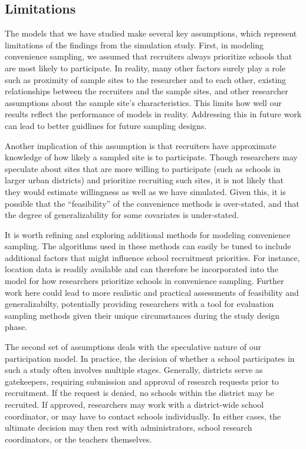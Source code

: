 \documentclass[man,floatsintext]{apa6}
\begin{document}
\hypertarget{limitations}{%
\subsection{Limitations}\label{limitations}}

The models that we have studied make several key assumptions, which represent limitations of the findings from the simulation study. First, in modeling convenience sampling, we assumed that recruiters always prioritize schools that are most likely to participate. In reality, many other factors surely play a role such as proximity of sample sites to the researcher and to each other, existing relationships between the recruiters and the sample sites, and other researcher assumptions about the sample site's characteristics. This limits how well our results reflect the performance of models in reality. Addressing this in future work can lead to better guidlines for future sampling designs.

Another implication of this assumption is that recruiters have approximate knowledge of how likely a sampled site is to participate. Though researchers may speculate about sites that are more willing to participate (such as schools in larger urban districts) and prioritize recruiting such sites, it is not likely that they would estimate willingness as well as we have simulated. Given this, it is possible that the \enquote{feasibility} of the convenience methods is over-stated, and that the degree of generalizability for some covariates is under-stated.

It is worth refining and exploring additional methods for modeling convenience sampling. The algorithms used in these methods can easily be tuned to include additional factors that might influence school recruitment priorities. For instance, location data is readily available and can therefore be incorporated into the model for how researchers prioritize schools in convenience sampling. Further work here could lead to more realistic and practical assessments of feasibility and generalizabilty, potentially providing researchers with a tool for evaluation sampling methods given their unique circumstances during the study design phase.

The second set of assumptions deals with the speculative nature of our participation model. In practice, the decision of whether a school participates in such a study often involves multiple stages. Generally, districts serve as gatekeepers, requiring submission and approval of research requests prior to recruitment. If the request is denied, no schools within the district may be recruited. If approved, researchers may work with a district-wide school coordinator, or may have to contact schools individually. In either cases, the ultimate decision may then rest with administrators, school research coordinators, or the teachers themselves.
\end{document}
